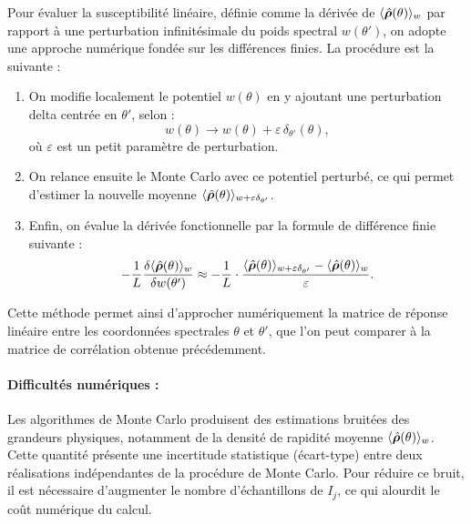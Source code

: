 Pour évaluer la susceptibilité linéaire, définie comme la dérivée de \( \langle \hat{\bm{\rho}}(\theta) \rangle_w \) par rapport à une perturbation infinitésimale du poids spectral \( w(\theta') \), on adopte une approche numérique fondée sur les différences finies. La procédure est la suivante :
\begin{enumerate}
    \item On modifie localement le potentiel \( w(\theta) \) en y ajoutant une perturbation delta centrée en \( \theta' \), selon :
    \begin{equation}
    	w(\theta) \rightarrow w(\theta) + \varepsilon\, \delta_{\theta'}(\theta),
   	\end{equation}
    où \( \varepsilon \) est un petit paramètre de perturbation.
    
    \item On relance ensuite le Monte Carlo avec ce potentiel perturbé, ce qui permet d’estimer la nouvelle moyenne \( \langle \hat{\bm{\rho}}(\theta) \rangle_{w + \varepsilon \delta_{\theta'}} \).
    
    \item Enfin, on évalue la dérivée fonctionnelle par la formule de différence finie suivante :
    \begin{equation}
    	-\frac{1}{L} \frac{\delta \langle\hat{\bm{\rho}} (\theta) \rangle_w }{\delta w(\theta') }  \approx -\frac{1}{L} \cdot \frac{ \langle \hat{\bm{\rho}}(\theta) \rangle_{w + \varepsilon \delta_{\theta'}} -  \langle\hat{\bm{\rho}} (\theta) \rangle_w }{ \varepsilon }.
    \end{equation}
\end{enumerate}

Cette méthode permet ainsi d’approcher numériquement la matrice de réponse linéaire entre les coordonnées spectrales \( \theta \) et \( \theta' \), que l’on peut comparer à la matrice de corrélation obtenue précédemment.


\paragraph{Difficultés numériques :}

Les algorithmes de Monte Carlo produisent des estimations bruitées des grandeurs physiques, notamment de la densité de rapidité moyenne \( \langle \hat{\bm{\rho}}(\theta) \rangle_w \). Cette quantité présente une incertitude statistique (écart-type) entre deux réalisations indépendantes de la procédure de Monte Carlo. Pour réduire ce bruit, il est nécessaire d’augmenter le nombre d’échantillons de ${I_j}$, ce qui alourdit le coût numérique du calcul.\\

